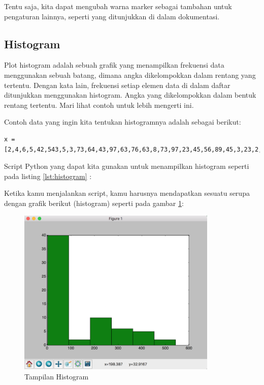 Tentu saja, kita dapat mengubah warna marker sebagai tambahan untuk pengaturan lainnya, seperti yang ditunjukkan di dalam dokumentasi.

\subsection{Histogram}
Plot histogram adalah sebuah grafik yang menampilkan frekuensi data menggunakan sebuah batang, dimana angka dikelompokkan dalam rentang yang tertentu. Dengan kata lain, frekuensi setiap elemen data di dalam daftar ditunjukkan menggunakan histogram. Angka yang dikelompokkan dalam bentuk rentang tertentu. Mari lihat contoh untuk lebih mengerti ini.

Contoh data yang ingin kita tentukan histogramnya adalah sebagai berikut:
\begin{verbatim}
x = [2,4,6,5,42,543,5,3,73,64,43,97,63,76,63,8,73,97,23,45,56,89,45,3,23,2,5,78,23,56,67,78,8,3,78,34,67,23,324,234,43,544,54,33,223,443,444,234,76,432,233,23,232,242,222,221,254,222,276,300,353,354,387,364,398]
\end{verbatim}
Script Python yang dapat kita gunakan untuk menampilkan histogram seperti pada listing \ref{lst:histogram} : 


Ketika kamu menjalankan script, kamu harusnya mendapatkan sesuatu serupa dengan grafik berikut (histogram) seperti pada gambar \ref{fig:histogram}:
\begin{figure}[!htbp]
	\centerline{\includegraphics[width=0.85\textwidth]{figures/6/histogram.PNG}}
	\caption{Tampilan Histogram}
	\label{fig:histogram}
\end{figure}

